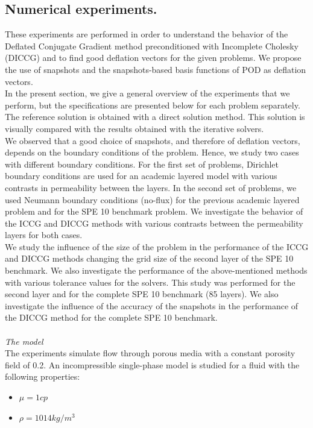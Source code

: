 \documentclass{ecmorXV}
\begin{document}
\subsection{Numerical experiments.}\label{numexp}
\hspace{0.5cm}These experiments are performed in order to understand the behavior of the Deflated Conjugate Gradient method 
preconditioned with Incomplete Cholesky (DICCG) and to find 
good deflation vectors for the given problems. We propose the use of snapshots and the snapshots-based 
basis functions of POD as deflation vectors.\\
In the present section, we give a general overview of the experiments that we perform, but the specifications
 are presented below for each problem separately. The reference solution is obtained with a direct solution method. 
 This solution is visually compared with the results obtained with the iterative solvers.\\
We observed that a good choice of snapshots, and therefore of deflation vectors, depends on the boundary 
conditions of the problem. Hence, we study two cases with different boundary conditions. 
For the first set of problems, Dirichlet boundary conditions are used for 
an academic layered model with various contrasts in permeability between the layers. 
In the second set of problems, we used Neumann boundary conditions (no-flux) for the previous academic
layered problem and for the SPE 10 benchmark problem. 
We investigate the behavior of the ICCG and DICCG methods with various contrasts between the 
permeability layers for both cases. \\
We study the influence of the size of the problem in the performance of the ICCG and DICCG methods 
changing the grid size of the second layer of the SPE 10 benchmark. 
We also investigate the performance of the above-mentioned methods 
with various tolerance values for the solvers. This study was performed for the second layer and 
for the complete SPE 10 benchmark (85 layers).
We also investigate the influence of the accuracy of the snapshots in 
the performance of the DICCG method for the complete SPE 10 benchmark.\\ \\
\emph{The model}\\
The experiments simulate flow through porous media with a constant porosity field of 0.2.
An incompressible single-phase model is
studied for a fluid with the following properties:
\begin{itemize}
 \item $\mu = 1 cp$
 \item $\rho = 1014 kg/m^3$
\end{itemize}
\end{document}
